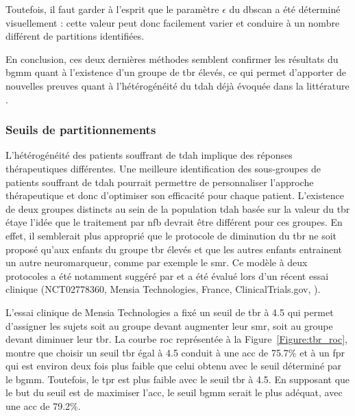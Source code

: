 Toutefois, il faut garder à l'esprit que le paramètre $\epsilon$ du \gls{dbscan} a été déterminé visuellement : cette valeur peut donc facilement varier et conduire à
un nombre différent de partitions identifiées. 

En conclusion, ces deux dernières méthodes semblent confirmer les résultats du \gls{bgmm} quant à l'existence d'un groupe de \gls{tbr} élevés, ce qui permet 
d'apporter de nouvelles preuves quant à l'hétérogénéité du \gls{tdah} déjà évoquée dans la littérature \citep{Arns2008, Arns2012, Barry2003, Clarke2011, 
Liechti2013, Loo2013, Loo2018}.

\subsubsection{Seuils de partitionnements}

L'hétérogénéité des patients souffrant de \gls{tdah} implique des réponses thérapeutiques différentes. Une meilleure identification des sous-groupes de patients souffrant de 
\gls{tdah} pourrait permettre de personnaliser l'approche thérapeutique et donc d'optimiser son efficacité pour chaque patient. L'existence de deux groupes distincts au sein de la 
population \gls{tdah} basée sur la valeur du \gls{tbr} étaye l'idée que le traitement par \gls{nfb} devrait être différent pour ces groupes. En effet, il semblerait
plus approprié que le protocole de diminution du \gls{tbr} ne soit proposé qu'aux enfants du groupe \gls{tbr} élevés et que les autres enfants entrainent un autre
neuromarqueur, comme par exemple le \gls{smr}. Ce modèle à deux protocoles a été notamment suggéré par \citet{Kerson2013, Arns2012} et a été évalué lors 
d'un récent essai clinique (NCT02778360, Mensia Technologies, France, ClinicalTrials.gov, \citet{Bioulac2019}).

L'essai clinique de Mensia Technologies a fixé un seuil de \gls{tbr} à 4.5 qui permet d'assigner les sujets soit au groupe devant augmenter leur \gls{smr}, soit 
au groupe devant diminuer leur \gls{tbr}. La courbe \gls{roc} représentée à la Figure~\ref{Figure:tbr_roc}, montre que choisir un seuil \gls{tbr} égal à 4.5 conduit
à une \gls{acc} de 75.7\% et à un \gls{fpr} qui est environ deux fois plus faible que celui obtenu avec le seuil déterminé par le \gls{bgmm}. Toutefois, 
le \gls{tpr} est plus faible avec le seuil \gls{tbr} à 4.5. En supposant que le but du seuil est de maximiser l'\gls{acc}, le seuil \gls{bgmm} serait le 
plus adéquat, avec une \gls{acc} de 79.2\%.

